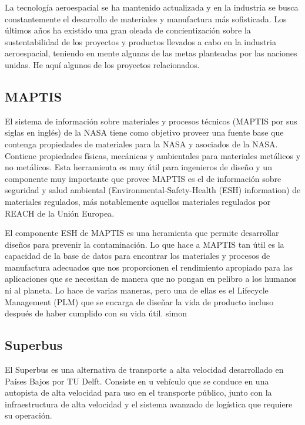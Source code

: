 \documentclass[12pt, letterpaper]{article}
\begin{document}
La tecnología aeroespacial se ha mantenido actualizada y en la industria se busca constantemente el desarrollo de materiales y manufactura más sofisticada. Los últimos años ha existido una gran oleada de concientización sobre la sustentabilidad de los proyectos y productos llevados a cabo en la industria aeroespacial, teniendo en mente algunas de las metas planteadas por las naciones unidas. He aquí algunos de los proyectos relacionados.

\subsection*{MAPTIS}

El sistema de información sobre materiales y procesos técnicos (MAPTIS por sus siglas en inglés) de la NASA tiene como objetivo proveer una fuente base que contenga propiedades de materiales para la NASA y asociados de la NASA. Contiene propiedades físicas, mecánicas y ambientales para materiales metálicos y no metálicos. Esta herramienta es muy útil para ingenieros de diseño y un componente muy importante que provee MAPTIS es el de información sobre seguridad y salud ambiental (Environmental-Safety-Health (ESH) information) de materiales regulados, más notablemente aquellos materiales regulados por REACH de la Unión Europea. 

El componente ESH de MAPTIS es una heramienta que permite desarrollar diseños para prevenir la contaminación. Lo que hace a MAPTIS tan útil es la capacidad de la base de datos para encontrar los materiales y procesos de manufactura adecuados que nos proporcionen el rendimiento apropiado para las aplicaciones que se necesitan de manera que no pongan en pelibro a los humanos ni al planeta. Lo hace de varias maneras, pero una de ellas es el Lifecycle Management (PLM) que se encarga de diseñar la vida de producto incluso después de haber cumplido con su vida útil. \parencite{isamu11} simon 

\subsection*{Superbus}

El Superbus es una alternativa de transporte a alta velocidad desarrollado en Países Bajos por TU Delft. Consiste en u vehículo que se conduce en una autopista de alta velocidad para uso en el transporte público, junto con la infraestructura de alta velocidad y el sistema avanzado de logística que requiere su operación. 
\end{document}
